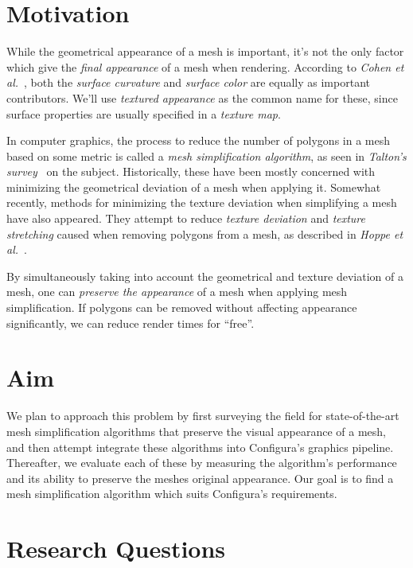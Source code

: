 \section{Motivation}
\label{sec:motivation}

While the geometrical appearance of a mesh is important, it's not the only factor which give the \emph{final appearance} of a mesh when rendering. According to \emph{Cohen et al.}~\cite{cohen1998appearance}, both the \emph{surface curvature} and \emph{surface color} are equally as important contributors. We'll use \emph{textured appearance} as the common name for these, since surface properties are usually specified in a \emph{texture map}.

In computer graphics, the process to reduce the number of polygons in a mesh based on some metric is called a \emph{mesh simplification algorithm}, as seen in \emph{Talton's survey}~\cite{talton2004short} on the subject. Historically, these have been mostly concerned with minimizing the geometrical deviation of a mesh when applying it. Somewhat recently, methods for minimizing the texture deviation when simplifying a mesh have also appeared. They attempt to reduce \emph{texture deviation} and \emph{texture stretching} caused when removing polygons from a mesh, as described in \emph{Hoppe et al.}~\cite{hoppe1996progressive}.

By simultaneously taking into account the geometrical and texture deviation of a mesh, one can \emph{preserve the appearance} of a mesh when applying mesh simplification. If polygons can be removed without affecting appearance significantly, we can reduce render times for ``free''.

\section{Aim}
\label{sec:aim}

We plan to approach this problem by first surveying the field for state-of-the-art mesh simplification algorithms that preserve the visual appearance of a mesh, and then attempt integrate these algorithms into Configura's graphics pipeline. Thereafter, we evaluate each of these by measuring the algorithm's performance and its ability to preserve the meshes original appearance. Our goal is to find a mesh simplification algorithm which suits Configura's requirements.

\section{Research Questions}
\label{sec:research-questions}

